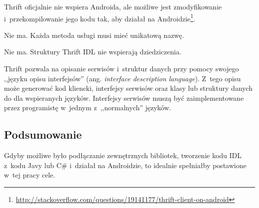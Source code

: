 \begin{description}
Thrift oficjalnie nie wspiera Androida, ale możliwe jest zmodyfikowanie i~przekompilowanie jego kodu tak, aby działał na Androidzie\footnote{\url{http://stackoverflow.com/questions/19141177/thrift-client-on-android}}.

Nie ma. Każda metoda usługi musi mieć unikatową nazwę\cite{thrift-features}.

Nie ma. Struktury Thrift IDL nie wspierają dziedziczenia\cite{thrift-features}.

Thrift pozwala na opisanie serwisów i~struktur danych przy pomocy swojego ,,języku opisu interfejsów'' (ang. \emph{interface description language}).
Z~tego opisu może generować kod kliencki, interfejsy serwisów oraz klasy lub struktury danych do dla wspieranych języków. \cite{thrift-features}
Interfejsy serwisów muszą być zaimplementowane przez programistę w~jednym z~,,normalnych'' języków.

\end{description}

\subsection{Podsumowanie}
Gdyby możliwe było podłączanie zewnętrznych bibliotek, tworzenie kodu IDL z~kodu Javy lub C\# i~działał na Androidzie, to idealnie spełniałby postawione w~tej pracy cele.



